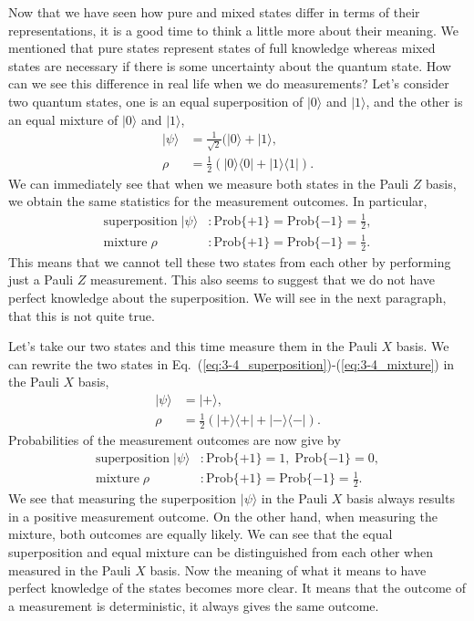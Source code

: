 Now that we have seen how pure and mixed states differ in terms of their representations, it is a good time to think a little more about their meaning.
We mentioned that pure states represent states of full knowledge whereas mixed states are necessary if there is some uncertainty about the quantum state.
How can we see this difference in real life when we do measurements?
Let's consider two quantum states, one is an equal superposition of $|0\rangle$ and $|1\rangle$, and the other is an equal mixture of $|0\rangle$ and $|1\rangle$,
\begin{align}
    |\psi\rangle & = \frac{1}{\sqrt{2}} (|0\rangle + |1\rangle, \label{eq:3-4_superposition}\\
    \rho & = \frac{1}{2} (|0\rangle\langle0| + |1\rangle\langle1|). \label{eq:3-4_mixture}
\end{align}
We can immediately see that when we measure both states in the Pauli $Z$ basis, we obtain the same statistics for the measurement outcomes.
In particular,
\begin{align}
    \text{superposition} \; |\psi\rangle & : \text{Prob}\{+1\} = \text{Prob}\{-1\} = \frac{1}{2},  \\
    \text{mixture} \; \rho & : \text{Prob}\{+1\} = \text{Prob}\{-1\} = \frac{1}{2}.
\end{align}
This means that we cannot tell these two states from each other by performing just a Pauli $Z$ measurement.
This also seems to suggest that we do not have perfect knowledge about the superposition.
We will see in the next paragraph, that this is not quite true.

Let's take our two states and this time measure them in the Pauli $X$ basis.
We can rewrite the two states in Eq.~(\ref{eq:3-4_superposition})-(\ref{eq:3-4_mixture}) in the Pauli $X$ basis,
\begin{align}
    |\psi\rangle & = |+\rangle, \\
    \rho & = \frac{1}{2} (|+\rangle\langle+| + |-\rangle\langle-|).
\end{align}
Probabilities of the measurement outcomes are now give by
\begin{align}
    \text{superposition} \; |\psi\rangle & : \text{Prob}\{+1\} = 1, \; \text{Prob}\{-1\} = 0,  \\
    \text{mixture} \; \rho & : \text{Prob}\{+1\} = \text{Prob}\{-1\} = \frac{1}{2}.
\end{align}
We see that measuring the superposition $|\psi\rangle$ in the Pauli $X$ basis always results in a positive measurement outcome.
On the other hand, when measuring the mixture, both outcomes are equally likely.
We can see that the equal superposition and equal mixture can be distinguished from each other when measured in the Pauli $X$ basis.
Now the meaning of what it means to have perfect knowledge of the states becomes more clear.
It means that the outcome of a measurement is deterministic, it always gives the same outcome.

